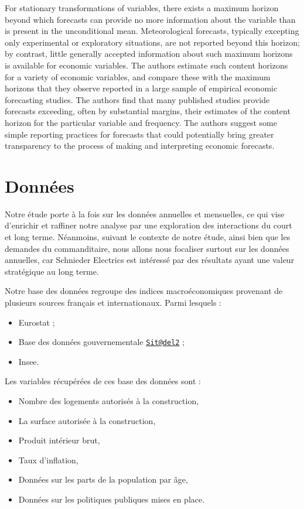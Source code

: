 \documentclass[11pt,]{article}
\providecommand{\tightlist}{%
  \setlength{\itemsep}{0pt}\setlength{\parskip}{0pt}}
\begin{document}
For stationary transformations of variables, there exists a maximum
horizon beyond which forecasts can provide no more information about the
variable than is present in the unconditional mean. Meteorological
forecasts, typically excepting only experimental or exploratory
situations, are not reported beyond this horizon; by contrast, little
generally accepted information about such maximum horizons is available
for economic variables. The authors estimate such content horizons for a
variety of economic variables, and compare these with the maximum
horizons that they observe reported in a large sample of empirical
economic forecasting studies. The authors find that many published
studies provide forecasts exceeding, often by substantial margins, their
estimates of the content horizon for the particular variable and
frequency. The authors suggest some simple reporting practices for
forecasts that could potentially bring greater transparency to the
process of making and interpreting economic forecasts.

\hypertarget{donnees}{%
\section{Données}\label{donnees}}

Notre étude porte à la fois sur les données annuelles et mensuelles, ce
qui vise d'enrichir et raffiner notre analyse par une exploration des
interactions du court et long terme. Néanmoins, suivant le contexte de
notre étude, ainsi bien que les demandes du commanditaire, nous allons
nous focaliser surtout sur les données annuelles, car Schnieder
Electrics est intéressé par des résultats ayant une valeur stratégique
au long terme.

Notre base des données regroupe des indices macroéconomiques provenant
de plusieurs sources français et internationaux. Parmi lesquels :

\begin{itemize}
\tightlist
\item
  Eurostat ;
\item
  Base des données gouvernementale
  \href{mailto:Sit@del2}{\nolinkurl{Sit@del2}} ;
\item
  Insee.
\end{itemize}

Les variables récupérées de ces base des données sont :

\begin{itemize}
\tightlist
\item
  Nombre des logements autorisés à la construction,
\item
  La surface autorisée à la construction,
\item
  Produit intérieur brut,
\item
  Taux d'inflation,
\item
  Données sur les parts de la population par âge,
\item
  Données sur les politiques publiques mises en place.
\end{itemize}
\end{document}
